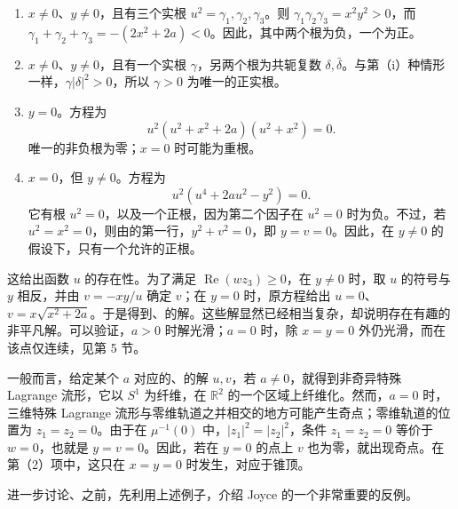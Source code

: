 \begin{example}
\begin{enumerate}[label=\textup{(\roman*)}]
\item $x\neq0$、$y\neq0$，且有三个实根 $u^2=\gamma_1,\gamma_2,\gamma_3$。则 $\gamma_1\gamma_2\gamma_3=x^2y^2>0$，而 $\gamma_1+\gamma_2+\gamma_3=-(2x^2+2a)<0$。因此，其中两个根为负，一个为正。
\item $x\neq0$、$y\neq0$，且有一个实根 $\gamma$，另两个根为共轭复数 $\delta,\bar\delta$。与第（i）种情形一样，$\gamma|\delta|^2>0$，所以 $\gamma>0$ 为唯一的正实根。
\item $y=0$。方程为
\[
u^2(u^2+x^2+2a)(u^2+x^2)=0.
\]
唯一的非负根为零；$x=0$ 时可能为重根。
\item $x=0$，但 $y\neq0$。方程为
\[
u^2(u^4+2au^2-y^2)=0.
\]
它有根 $u^2=0$，以及一个正根，因为第二个因子在 $u^2=0$ 时为负。不过，若 $u^2=x^2=0$，则由的第一行，$y^2+v^2=0$，即 $y=v=0$。因此，在 $y\neq0$ 的假设下，只有一个允许的正根。
\end{enumerate}

这给出函数 $u$ 的存在性。为了满足 $\operatorname{Re}(wz_3)\geq0$，在 $y\neq0$ 时，取 $u$ 的符号与 $y$ 相反，并由 $v=-xy/u$ 确定 $v$；在 $y=0$ 时，原方程给出 $u=0$、$v=x\sqrt{x^2+2a}$。于是得到、的解。这些解显然已经相当复杂，却说明存在有趣的非平凡解。可以验证，$a>0$ 时解光滑；$a=0$ 时，除 $x=y=0$ 外仍光滑，而在该点仅连续，见第 5 节。
\end{example}

一般而言，给定某个 $a$ 对应的、的解 $u,v$，若 $a\neq0$，就得到非奇异特殊 Lagrange 流形，它以 $S^1$ 为纤维，在 $\mathbb R^2$ 的一个区域上纤维化。然而，$a=0$ 时，三维特殊 Lagrange 流形与零维轨道之并相交的地方可能产生奇点；零维轨道的位置为 $z_1=z_2=0$。由于在 $\mu^{-1}(0)$ 中，$|z_1|^2=|z_2|^2$，条件 $z_1=z_2=0$ 等价于 $w=0$，也就是 $y=v=0$。因此，若在 $y=0$ 的点上 $v$ 也为零，就出现奇点。在第（2）项中，这只在 $x=y=0$ 时发生，对应于锥顶。

进一步讨论、之前，先利用上述例子，介绍 Joyce 的一个非常重要的反例。


